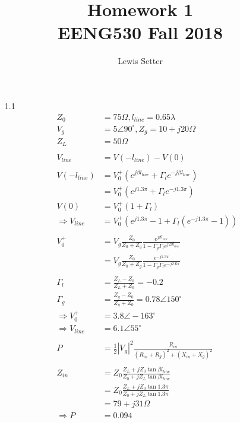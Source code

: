 \documentclass{article}
\title{Homework 1 \\ EENG530 Fall 2018}
\author{Lewis Setter}
\begin{document}
\maketitle

\begin{enumerate}
\item[1.1]
\ \\
\begin{align*}
Z_0 &= 75 \Omega, l_{line} = 0.65\lambda \\
V_g &= 5\angle 90^{\circ}, Z_g = 10 + j20 \Omega \\
Z_L &= 50 \Omega \\
\\
V_{line} &= V(-l_{line}) - V(0) \\
\\
V(-l_{line}) &= V_{0}^{+}(e^{j\beta l_{line}} + \Gamma_l e^{-j\beta l_{line}}) \\
&= V_{0}^{+}(e^{j 1.3 \pi} + \Gamma_l e^{-j 1.3 \pi}) \\
V(0) &= V_{0}^{+}(1 + \Gamma_l) \\
\Rightarrow V_{line} &= V_{0}^{+}(e^{j 1.3 \pi} - 1 + \Gamma_l(e^{-j 1.3 \pi} - 1)) \\
\\
V_{0}^{+} &= V_g \frac{Z_0}{Z_0+Z_g} \frac{e^{j \beta l_{line}}}
{1-\Gamma_g \Gamma_l e^{j 2 \beta l_{line}}} \\
&= V_g \frac{Z_0}{Z_0+Z_g} \frac{e^{-j 1.3 \pi}}
{1-\Gamma_g \Gamma_l e^{-j 2.6 \pi}} \\
\\
\Gamma_l &= \frac{Z_L-Z_0}{Z_L+Z_0} = -0.2 \\
\Gamma_g &= \frac{Z_g-Z_0}{Z_g+Z_0} = 0.78 \angle 150^{\circ} \\
\Rightarrow V_{0}^{+} &= 3.8 \angle -163^{\circ} \\
\Rightarrow V_{line} &= 6.1 \angle 55^{\circ} \\
\\
P &= \frac{1}{2} {|V_g|}^2 \frac{R_{in}}{{(R_{in}+R_g)}^2 + {(X_{in}+X_g)}^2} \\
\\
Z_{in} &= Z_0 \frac{Z_L + j Z_0 \tan{\beta l_{line}}}{Z_0 + j Z_L \tan{\beta l_{line}}} \\
&= Z_0 \frac{Z_L + j Z_0 \tan{1.3 \pi}}{Z_0 + j Z_L \tan{1.3 \pi}} \\
&= 79 + j 31 \Omega \\
\Rightarrow P &= 0.094
\end{align*}


\end{enumerate}
\end{document}
